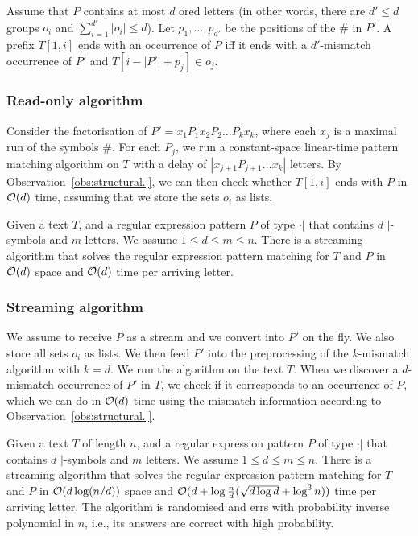 \documentclass{article}
\begin{document}
\begin{observation}
\label{obs:structural.|}
Assume that $P$ contains at most $d$ ored letters (in other words, there are $d' \leq d$ groups $o_i$ and $\sum_{i=1}^{d'} |o_i| \leq d$). Let $p_1,\ldots,p_{d'}$  be the positions of the $\#$ in $P'$.
A prefix $T[1,i]$ ends with an occurrence of $P$ iff it ends with a $d'$-mismatch occurrence of $P'$ and $T[i-|P'|+p_j] \in o_j$.
\end{observation}

\subsubsection{Read-only algorithm}
Consider the factorisation of $P' = x_1 P_1 x_2 P_2 \ldots P_k x_k$, where each $x_j$ is a maximal run of the symbols $\#$. For each $P_j$, we run a constant-space linear-time pattern matching algorithm on $T$ with a delay of $|x_{j+1} P_{j+1} \ldots x_k|$ letters. By Observation~\ref{obs:structural.|}, we can then check whether $T[1,i]$ ends with $P$ in $\mathcal{O}(d)$ time, assuming that we store the sets $o_i$ as lists.

\begin{corollary}
Given a text $T$, and a regular expression pattern $P$ of type $\cdot|$ that contains $d$ $|$-symbols and $m$ letters. We assume $1 \leq d \leq m \leq n$. There is a streaming algorithm that solves the regular expression pattern matching for $T$ and $P$ in $\mathcal{O}(d)$ space and $\mathcal{O}(d)$ time per arriving letter. 
\end{corollary}

\subsubsection{Streaming algorithm}
We assume to receive $P$ as a stream and we convert into $P'$ on the fly. We also store all sets $o_i$ as lists. 
We then feed $P'$ into the preprocessing of the $k$-mismatch algorithm with $k=d$.
We run the algorithm on the text $T$. When we discover a $d$-mismatch occurrence of $P'$ in $T$, we check if it corresponds to an occurrence of $P$, which we can do in $\mathcal{O}(d)$ time using the mismatch information according to Observation~\ref{obs:structural.|}.


\begin{corollary}
Given a text $T$ of length $n$, and a regular expression pattern $P$ of type $\cdot|$ that contains $d$ $|$-symbols and $m$ letters. We assume $1 \leq d \leq m \leq n$. There is a streaming algorithm that solves the regular expression pattern matching for $T$ and $P$ in $\mathcal{O}(d\log(n/d))$ space and $\mathcal{O}(d + \log\frac{n}{d} (\sqrt{d\log d}+\log^3 n))$ time per arriving letter. The  algorithm  is  randomised  and  errs  with  probability inverse polynomial in $n$, i.e., its answers are correct with high probability.
\end{corollary}
\end{document}
